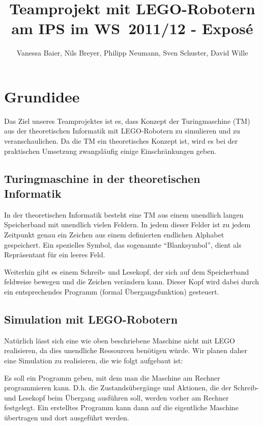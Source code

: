 \documentclass[a4paper,12pt]{article}
\begin{document}
\newcommand{\TODO}[1]{{\bf{TODO: #1}}}

\author{Vanessa Baier, Nils Breyer, Philipp Neumann, Sven Schuster, David Wille}
\title{Teamprojekt mit LEGO-Robotern am IPS im \mbox{WS 2011/12} - Exposé}

\maketitle

\section{Grundidee}

Das Ziel unseres Teamprojektes ist es, dass Konzept der Turingmaschine (TM) aus der theoretischen Informatik mit LEGO-Robotern zu simulieren und zu veranschaulichen. Da die TM ein theoretisches Konzept ist, wird es bei der praktischen Umsetzung zwangsläufig einige Einschränkungen geben.

\subsection{Turingmaschine in der theoretischen Informatik}

In der theoretischen Informatik besteht eine TM aus einem unendlich langen Speicherband mit unendlich vielen Feldern. In jedem dieser Felder ist zu jedem Zeitpunkt genau ein Zeichen aus einem definierten endlichen Alphabet gespeichert. Ein spezielles Symbol, das sogenannte "`Blanksymbol"', dient als Repräsentant für ein leeres Feld.
 
Weiterhin gibt es einem Schreib- und Lesekopf, der sich auf dem Speicherband feldweise bewegen und die Zeichen verändern kann. Dieser Kopf wird dabei durch ein entsprechendes Programm (formal Übergangsfunktion) gesteuert.

\subsection{Simulation mit LEGO-Robotern}

Natürlich lässt sich eine wie oben beschriebene Maschine nicht mit LEGO realisieren, da dies unendliche Ressourcen benötigen würde. Wir planen daher eine Simulation zu realisieren, die wie folgt aufgebaut ist:

Es soll ein Programm geben, mit dem man die Maschine am Rechner programmieren kann. D.h. die Zustandsübergänge und Aktionen, die der Schreib- und Lesekopf beim Übergang ausführen soll, werden vorher am Rechner festgelegt. Ein erstelltes Programm kann dann auf die eigentliche Maschine übertragen und dort ausgeführt werden.
\end{document}
